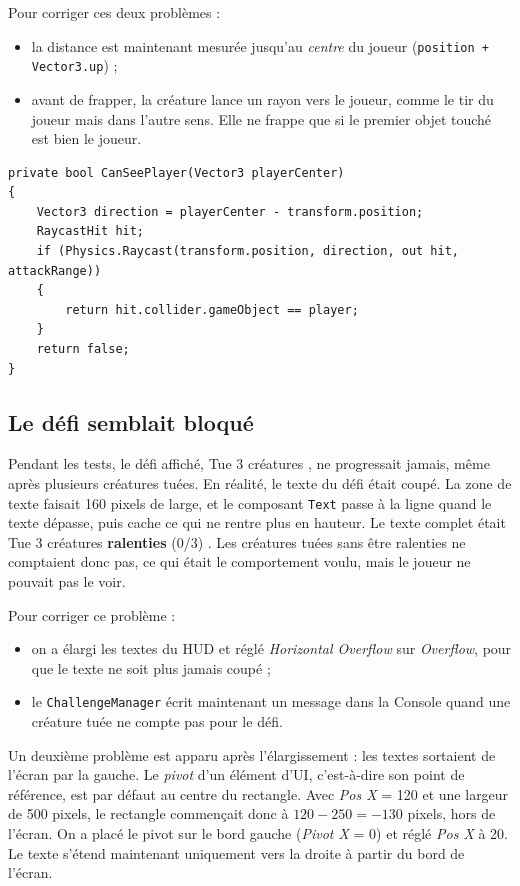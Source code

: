\documentclass[11pt,a4paper]{article}
\begin{document}
Pour corriger ces deux problèmes :
\begin{itemize}
  \item la distance est maintenant mesurée jusqu'au \emph{centre} du joueur (\texttt{position + Vector3.up}) ;
  \item avant de frapper, la créature lance un rayon vers le joueur, comme le tir du joueur mais dans l'autre sens. Elle ne frappe que si le premier objet touché est bien le joueur.
\end{itemize}
\begin{lstlisting}
private bool CanSeePlayer(Vector3 playerCenter)
{
    Vector3 direction = playerCenter - transform.position;
    RaycastHit hit;
    if (Physics.Raycast(transform.position, direction, out hit, attackRange))
    {
        return hit.collider.gameObject == player;
    }
    return false;
}
\end{lstlisting}

\subsection{Le défi semblait bloqué}
Pendant les tests, le défi affiché, \og Tue 3 créatures \fg{}, ne progressait jamais, même après plusieurs créatures tuées. En réalité, le texte du défi était coupé. La zone de texte faisait 160 pixels de large, et le composant \texttt{Text} passe à la ligne quand le texte dépasse, puis cache ce qui ne rentre plus en hauteur. Le texte complet était \og Tue 3 créatures \textbf{ralenties} (0/3) \fg{}. Les créatures tuées sans être ralenties ne comptaient donc pas, ce qui était le comportement voulu, mais le joueur ne pouvait pas le voir.

Pour corriger ce problème :
\begin{itemize}
  \item on a élargi les textes du HUD et réglé \emph{Horizontal Overflow} sur \emph{Overflow}, pour que le texte ne soit plus jamais coupé ;
  \item le \texttt{ChallengeManager} écrit maintenant un message dans la Console quand une créature tuée ne compte pas pour le défi.
\end{itemize}
Un deuxième problème est apparu après l'élargissement : les textes sortaient de l'écran par la gauche. Le \emph{pivot} d'un élément d'UI, c'est-à-dire son point de référence, est par défaut au centre du rectangle. Avec \emph{Pos X} = 120 et une largeur de 500 pixels, le rectangle commençait donc à $120 - 250 = -130$ pixels, hors de l'écran. On a placé le pivot sur le bord gauche (\emph{Pivot X} = 0) et réglé \emph{Pos X} à 20. Le texte s'étend maintenant uniquement vers la droite à partir du bord de l'écran.
\end{document}
